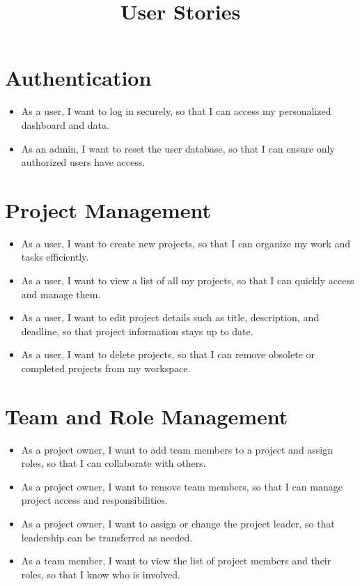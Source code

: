 \documentclass{article}
\title{User Stories}
\date{}
\begin{document}
\maketitle

\section{Authentication}
\begin{itemize}[leftmargin=*, label=--]
    \item As a user, I want to log in securely, so that I can access my personalized dashboard and data.
    \item As an admin, I want to reset the user database, so that I can ensure only authorized users have access.
\end{itemize}

\section{Project Management}
\begin{itemize}[leftmargin=*, label=--]
    \item As a user, I want to create new projects, so that I can organize my work and tasks efficiently.
    \item As a user, I want to view a list of all my projects, so that I can quickly access and manage them.
    \item As a user, I want to edit project details such as title, description, and deadline, so that project information stays up to date.
    \item As a user, I want to delete projects, so that I can remove obsolete or completed projects from my workspace.
\end{itemize}

\section{Team and Role Management}
\begin{itemize}[leftmargin=*, label=--]
    \item As a project owner, I want to add team members to a project and assign roles, so that I can collaborate with others.
    \item As a project owner, I want to remove team members, so that I can manage project access and responsibilities.
    \item As a project owner, I want to assign or change the project leader, so that leadership can be transferred as needed.
    \item As a team member, I want to view the list of project members and their roles, so that I know who is involved.
\end{itemize}
\end{document}
